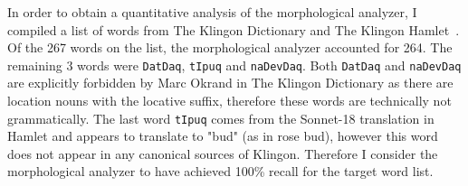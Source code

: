 \documentclass[11pt]{article}
\begin{document}
In order to obtain a quantitative analysis of the morphological analyzer, I compiled a list of words from The Klingon Dictionary and The Klingon Hamlet~\cite{0964434512}. Of the 267 words on the list, the morphological analyzer accounted for 264. The remaining 3 words were \texttt{DatDaq}, \texttt{tIpuq} and \texttt{naDevDaq}. Both \texttt{DatDaq} and \texttt{naDevDaq} are explicitly forbidden by Marc Okrand in The Klingon Dictionary as there are location nouns with the locative suffix, therefore these words are technically not grammatically. The last word \texttt{tIpuq} comes from the Sonnet-18 translation in Hamlet and appears to translate to "bud" (as in rose bud), however this word does not appear in any canonical sources of Klingon. Therefore I consider the morphological analyzer to have achieved 100\% recall for the target word list.



\end{document}
